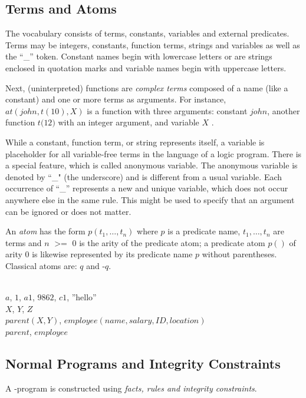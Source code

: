 \documentclass[a4paper, titlepage]{article}
\DeclareMathOperator{\geeq}{>=}
\begin{document}
\subsection{Terms and Atoms}
The vocabulary consists of terms, constants, variables and 
external predicates. Terms may be integers, constants, function terms, 
strings and variables as well as the \enquote{\_} token. 
Constant names begin with lowercase letters or are strings 
enclosed in quotation marks and variable names begin with 
uppercase letters.

Next, (uninterpreted) functions are \emph{complex terms} composed of a name
(like a constant) and one or more terms as arguments.
For instance,
$\mathit{at(john,t(10),X)}$ is a function with three arguments: constant $\mathit{john}$,
another function $\mathit{t(12})$ with an integer argument, and variable $X$ \cite{gkklorst2015}.

While a constant, function term, or string represents itself, a variable is 
placeholder for all variable-free terms in the language of 
a logic program. There is a special feature, which is 
called anonymous variable. The anonymous variable is 
denoted by ``\_" (the underscore) and is different from a 
usual variable. Each occurrence of \enquote{\_} represents 
a new and unique variable, which does not occur anywhere 
else in the same rule. This might be used to specify that 
an argument can be ignored or does not matter.

An \emph{atom} has the form $\mathit{p(t_1,\dots,t_n)}$ where 
$p$ is a predicate name, $t_1,\dots,t_n$ are terms and $n$ 
$\geeq$ $0$ is the arity of the predicate atom; a predicate 
atom $p()$ of arity 0 is likewise represented by its 
predicate name $p$ without parentheses. Classical atoms 
are: $q$ and -$q$.
\begin{exmp}
\text{   }
\\  $a$, $1$, $\mathit{a1}$, 
$\mathit{9862}$, $\mathit{c1}$, ''hello''
\\  $X$, $Y$, $Z$
\\  $\mathit{parent}(X,Y)$, $\mathit{employee}
(name, salary, ID, location)$
\\  $\mathit{parent}$, $\mathit{employee}$
\end{exmp}


\subsection{Normal Programs and Integrity Constraints}
A \hex{}-program is constructed using \emph{facts, rules 
and integrity constraints}. 
\end{document}
